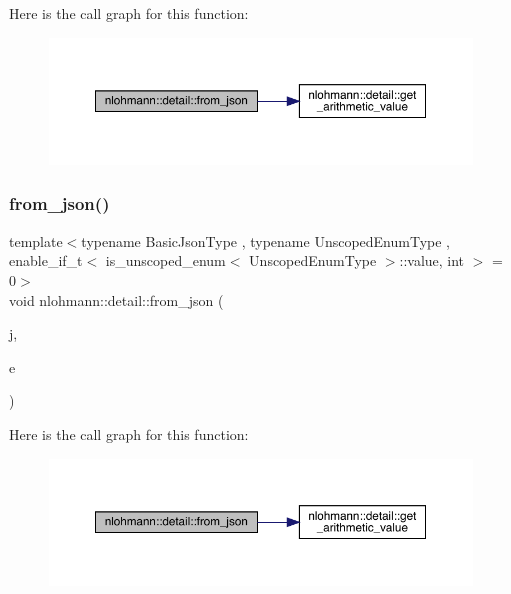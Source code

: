 Here is the call graph for this function\+:
\nopagebreak
\begin{figure}[H]
\begin{center}
\leavevmode
\includegraphics[width=350pt]{namespacenlohmann_1_1detail_a047d881e611fcac709dc318f730a1732_cgraph}
\end{center}
\end{figure}
\mbox{\label{namespacenlohmann_1_1detail_acf8dd944c2c7455880dee6f0b355aa01}} 
\subsubsection{\texorpdfstring{from\_json()}{from\_json()}\hspace{0.1cm}{\footnotesize\ttfamily [6/11]}}
{\footnotesize\ttfamily template$<$typename Basic\+Json\+Type , typename Unscoped\+Enum\+Type , enable\+\_\+if\+\_\+t$<$ is\+\_\+unscoped\+\_\+enum$<$ Unscoped\+Enum\+Type $>$\+::value, int $>$  = 0$>$ \\
void nlohmann\+::detail\+::from\+\_\+json (\begin{DoxyParamCaption}\item[{const Basic\+Json\+Type \&}]{j,  }\item[{Unscoped\+Enum\+Type \&}]{e }\end{DoxyParamCaption})}

Here is the call graph for this function\+:
\nopagebreak
\begin{figure}[H]
\begin{center}
\leavevmode
\includegraphics[width=350pt]{namespacenlohmann_1_1detail_acf8dd944c2c7455880dee6f0b355aa01_cgraph}
\end{center}
\end{figure}
\mbox{\label{namespacenlohmann_1_1detail_abc62958462b916726b89f25fa381a129}} 
